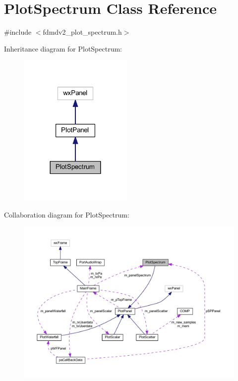 \hypertarget{class_plot_spectrum}{\section{Plot\-Spectrum Class Reference}
\label{class_plot_spectrum}
}


{\ttfamily \#include $<$fdmdv2\-\_\-plot\-\_\-spectrum.\-h$>$}



Inheritance diagram for Plot\-Spectrum\-:\nopagebreak
\begin{figure}[H]
\begin{center}
\leavevmode
\includegraphics[width=156pt]{class_plot_spectrum__inherit__graph}
\end{center}
\end{figure}


Collaboration diagram for Plot\-Spectrum\-:
\nopagebreak
\begin{figure}[H]
\begin{center}
\leavevmode
\includegraphics[width=350pt]{class_plot_spectrum__coll__graph}
\end{center}
\end{figure}
